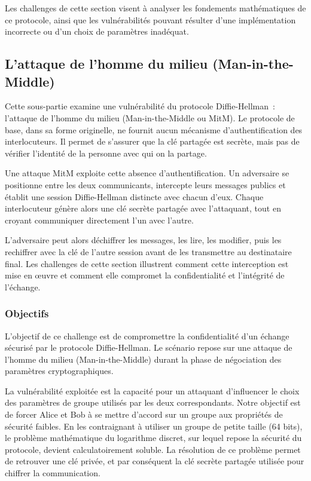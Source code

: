 \documentclass[12pt, a4paper]{article}
\begin{document}
        Les challenges de cette section visent à analyser les fondements mathématiques de ce protocole, ainsi que les vulnérabilités pouvant résulter d'une implémentation incorrecte ou d'un choix de paramètres inadéquat.
                
        \subsection{L'attaque de l'homme du milieu (Man-in-the-Middle)}
        
        Cette sous-partie examine une vulnérabilité du protocole Diffie-Hellman~: l'attaque de l'homme du milieu (Man-in-the-Middle ou MitM). Le protocole de base, dans sa forme originelle, ne fournit aucun mécanisme d'authentification des interlocuteurs. Il permet de s'assurer que la clé partagée est secrète, mais pas de vérifier l'identité de la personne avec qui on la partage.
        
        Une attaque MitM exploite cette absence d'authentification. Un adversaire se positionne entre les deux communicants, intercepte leurs messages publics et établit une session Diffie-Hellman distincte avec chacun d'eux. Chaque interlocuteur génère alors une clé secrète partagée avec l'attaquant, tout en croyant communiquer directement l'un avec l'autre.
        
        L'adversaire peut alors déchiffrer les messages, les lire, les modifier, puis les rechiffrer avec la clé de l'autre session avant de les transmettre au destinataire final. Les challenges de cette section illustrent comment cette interception est mise en œuvre et comment elle compromet la confidentialité et 
        l'intégrité de l'échange.

\subsubsection{Objectifs}

L'objectif de ce challenge est de compromettre la confidentialité d'un échange sécurisé par le protocole Diffie-Hellman. Le scénario repose sur une attaque de l'homme du milieu (Man-in-the-Middle) durant la phase de négociation des paramètres cryptographiques.

La vulnérabilité exploitée est la capacité pour un attaquant d'influencer le choix des paramètres de groupe utilisés par les deux correspondants. Notre objectif est de forcer Alice et Bob à se mettre d'accord sur un groupe aux propriétés de sécurité faibles. En les contraignant à utiliser un groupe de petite taille (64 bits), le problème mathématique du logarithme discret, sur lequel repose la sécurité du protocole, devient calculatoirement soluble. La résolution de ce problème permet de retrouver une clé privée, et par conséquent la clé secrète partagée utilisée pour chiffrer la communication.
\end{document}
